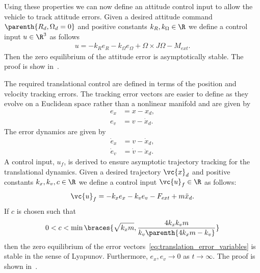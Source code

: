 \documentclass[smallextended]{svjour3}       %
\begin{document}
Using these properties we can now define an attitude control input to allow the vehicle to track attitude errors.
Given a desired attitude command \( \parenth{R_d, \Omega_d = 0} \) and positive constants \( k_R, k_\Omega \in \R \) we define a control input \( u \in \R^3 \) as follows
\begin{gather}
    u = -k_R e_R - k_\Omega e_\Omega + \Omega \times J \Omega - M_{ext}. \label{eqn:nodist_control}
\end{gather}
Then the zero equilibrium of the attitude error is asymptotically stable.
The proof is show in~\cite{kulumani2017a}.

The required translational control are defined in terms of the position and velocity tracking errors.
The tracking error vectors are easier to define as they evolve on a Euclidean space rather than a nonlinear manifold and are given by
\begin{subequations}\label{eq:translation_error_variables}
\begin{align}
    e_x &= x - x_d ,\\
    e_v &= v - \dot{x}_d.
\end{align}
\end{subequations}
The error dynamics are given by
\begin{subequations}\label{eq:translation_error_dynamics}
\begin{align}
    \dot{e}_x &= v - \dot{x}_d, \\
    \dot{e}_v &= \dot{v} - \ddot{x}_d .
\end{align}
\end{subequations}
A control input, \( u_f \), is derived to ensure asymptotic trajectory tracking for the translational dynamics.
    Given a desired trajectory \( \vc{x}_d \) and positive constants \( k_x, k_v, c \in \R \) we define a control input \( \vc{u}_f \in \R \) as follows:
    \begin{align}\label{eq:translational_control}
        \vc{u}_f = -k_x e_x - k_v e_v - F_{ext} + m \ddot{x}_d .
    \end{align}
    If \( c \) is chosen such that
    \begin{align}\label{eq:translational_control_gain_bound}
        0 < c < \min \braces{\sqrt{k_x m}, \frac{4 k_x k_v m}{ k_v \parenth{4 k_x m - k_v} }   }
    \end{align}
    then the zero equilibrium of the error vectors~\cref{eq:translation_error_variables} is stable in the sense of Lyapunov.
    Furthermore, \( e_x, e_v \to 0 \) as \( t \to \infty\).
    The proof is shown in~\cite{kulumani2017a}.
\end{document}
